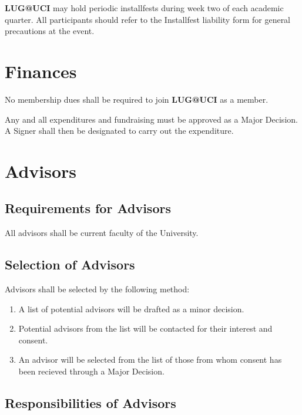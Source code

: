 \documentclass{article}
\begin{document}
\textbf{LUG@UCI} may hold periodic installfests during week two of each
academic quarter. All participants should refer to the Installfest liability
form for general precautions at the event.

\section{Finances}

No membership dues shall be required to join \textbf{LUG@UCI} as a member.

Any and all expenditures and fundraising must be approved as a Major Decision.
A Signer shall then be designated to carry out the expenditure.


\section{Advisors}


\subsection{Requirements for Advisors}

All advisors shall be current faculty of the University.

\subsection{Selection of Advisors}

Advisors shall be selected by the following method:

\begin{enumerate}
\item A list of potential advisors will be drafted as a minor decision.
\item Potential advisors from the list will be contacted for their
    interest and consent.
\item An advisor will be selected from the list of those from whom
    consent has been recieved through a Major Decision.
\end{enumerate}

\subsection{Responsibilities of Advisors}
\end{document}
